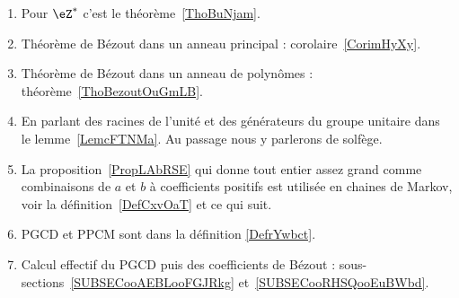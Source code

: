  \label{THEMEooNRZHooYuuHyt}
    \begin{enumerate}
        \item
            Pour \( \eZ^*\) c'est le théorème~\ref{ThoBuNjam}.
        \item
            Théorème de Bézout dans un anneau principal : corolaire~\ref{CorimHyXy}.
        \item
            Théorème de Bézout dans un anneau de polynômes : théorème~\ref{ThoBezoutOuGmLB}.
        \item
            En parlant des racines de l'unité et des générateurs du groupe unitaire dans le lemme~\ref{LemcFTNMa}. Au passage nous y parlerons de solfège.
        \item
            La proposition~\ref{PropLAbRSE} qui donne tout entier assez grand comme combinaisons de \( a \) et \( b\) à coefficients positifs est utilisée en chaines de Markov, voir la définition~\ref{DefCxvOaT} et ce qui suit.
        \item
            PGCD et PPCM sont dans la définition \ref{DefrYwbct}.
        \item
            Calcul effectif du PGCD puis des coefficients de Bézout : sous-sections~\ref{SUBSECooAEBLooFGJRkg} et~\ref{SUBSECooRHSQooEuBWbd}.
        \end{enumerate}



